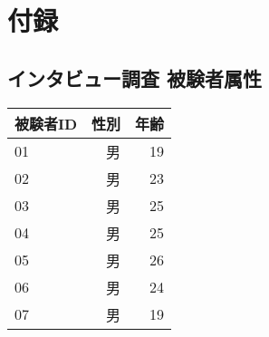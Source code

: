 \chapter{付録}\label{chap:appendix}

\section{インタビュー調査
被験者属性}\label{ux30a4ux30f3ux30bfux30d3ux30e5ux30fcux8abfux67fb-ux88abux9a13ux8005ux5c5eux6027}

\begin{longtable}[c]{@{}lrr@{}}
\toprule
被験者ID & 性別 & 年齢\tabularnewline
\midrule
\endhead
01 & 男 & 19\tabularnewline
02 & 男 & 23\tabularnewline
03 & 男 & 25\tabularnewline
04 & 男 & 25\tabularnewline
05 & 男 & 26\tabularnewline
06 & 男 & 24\tabularnewline
07 & 男 & 19\tabularnewline
\bottomrule
\end{longtable}
